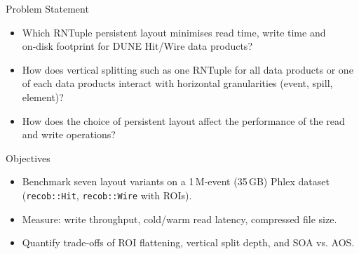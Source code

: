 \documentclass[aspectratio=169]{beamer}
\begin{document}
\begin{frame}{Problem Statement}
  \begin{itemize}
    \item Which RNTuple persistent layout minimises read time, write time and on‑disk footprint for DUNE Hit/Wire data products?
    
    \vspace{2em}

    \item How does vertical splitting such as one RNTuple for all data products or one of each data products interact with horizontal granularities (event, spill, element)?

    \vspace{2em}

    \item How does the choice of persistent layout affect the performance of the read and write operations?
  \end{itemize}
\end{frame}

\begin{frame}{Objectives}
  \begin{itemize}
    \item Benchmark seven layout variants on a 1\,M‑event (35\,GB) Phlex dataset (\texttt{recob::Hit}, \texttt{recob::Wire} with ROIs).
    
    \vspace{2em}

    \item Measure: write throughput, cold/warm read latency, compressed file size.

    \vspace{2em}

    \item Quantify trade‑offs of ROI flattening, vertical split depth, and SOA vs. AOS.
  \end{itemize}
\end{frame}

\end{document}
